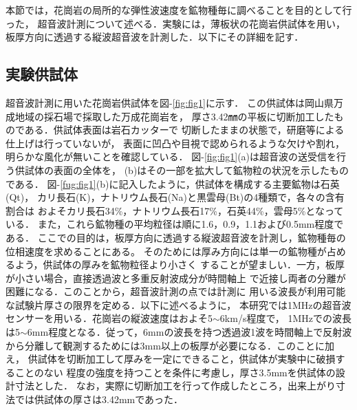﻿%
本節では，花崗岩の局所的な弾性波速度を鉱物種毎に調べることを目的として行った，
超音波計測について述べる．実験には，薄板状の花崗岩供試体を用い，
板厚方向に透過する縦波超音波を計測した．以下にその詳細を記す．
\subsection{実験供試体}
超音波計測に用いた花崗岩供試体を図-\ref{fig:fig1}に示す．
この供試体は岡山県万成地域の採石場で採取した万成花崗岩を，
厚さ3.42㎜の平板に切断加工したものである．供試体表面は岩石カッターで
切断したままの状態で，研磨等による仕上げは行っていないが，
表面に凹凸や目視で認められるような欠けや割れ，明らかな風化が無いことを確認している．
図-\ref{fig:fig1}(a)は超音波の送受信を行う供試体の表面の全体を，
(b)はその一部を拡大して鉱物粒の状況を示したものである．
図-\ref{fug:fig1}(b)に記入したように，供試体を構成する主要鉱物は石英(Qt)，
カリ長石(K)，ナトリウム長石(Na)と黒雲母(Bt)の4種類で，各々の含有割合は
およそカリ長石34\%，ナトリウム長石17\%，石英44\%，雲母5\%となっている．
また，これら鉱物種の平均粒径は順に1.6，0.9，1.1および0.5mm程度である．
ここでの目的は，板厚方向に透過する縦波超音波を計測し，鉱物種毎の位相速度を求めることにある。
そのためには厚み方向には単一の鉱物種が占めるよう，供試体の厚みを鉱物粒径より小さく
することが望ましい．一方，板厚が小さい場合，直接透過波と多重反射波成分が時間軸上
で近接し両者の分離が困難になる．このことから，超音波計測の点では計測に
用いる波長が利用可能な試験片厚さの限界を定める．以下に述べるように，
本研究では1MHzの超音波センサーを用いる．花崗岩の縦波速度はおよそ5$\sim$6km/s程度で，
1MHzでの波長は5$\sim$6mm程度となる．従って，6mmの波長を持つ透過波1波を時間軸上で反射波
から分離して観測するためには3mm以上の板厚が必要になる．このことに加え，
供試体を切断加工して厚みを一定にできること，供試体が実験中に破損することのない
程度の強度を持つことを条件に考慮し，厚さ3.5mmを供試体の設計寸法とした．
なお，実際に切断加工を行って作成したところ，出来上がり寸法では供試体の厚さは3.42mmであった．
